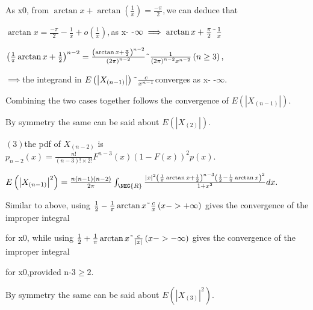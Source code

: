 \documentclass{article}
\begin{document}
As x\TEXTsymbol{<}0, from $\arctan x+\arctan \left( \frac{1}{x}\right) =%
\frac{-\pi }{2},$we can deduce that 

$\arctan x=\frac{-\pi }{2}-\frac{1}{x}+o\left( \frac{1}{x}\right) ,$as x-%
\TEXTsymbol{>}-$\infty \implies \arctan x+\frac{\pi }{2}\symbol{126}\frac{1}{%
x}$

$\left( \frac{1}{\pi }\arctan x+\frac{1}{2}\right) ^{n-2}=\frac{\left(
\arctan x+\frac{\pi }{2}\right) ^{n-2}}{\left( 2\pi \right) ^{n-2}}\symbol{%
126}\frac{1}{\left( 2\pi \right) ^{n-2}x^{n-2}}\left( n\geq 3\right) ,$

$\implies $the integrand in $E\left( \left\vert X_{\left( n-1\right)
}\right\vert \right) \symbol{126}\frac{c}{x^{n-1}}$converges as x-%
\TEXTsymbol{>}-$\infty .$

Combining the two cases together follows the convergence of $E\left(
\left\vert X_{\left( n-1\right) }\right\vert \right) .$

By symmetry the same can be said about $E\left( \left\vert X_{\left(
2\right) }\right\vert \right) .$

$\left( 3\right) $the pdf of $X_{\left( n-2\right) }$ is $p_{n-2}\left(
x\right) =\frac{n!}{\left( n-3\right) !\times 2!}F^{n-3}\left( x\right)
\left( 1-F\left( x\right) \right) ^{2}p\left( x\right) .$

$E\left( \left\vert X_{\left( n-1\right) }\right\vert ^{2}\right) =\frac{%
n\left( n-1\right) \left( n-2\right) }{2\pi }\int_{\NEG{R}}\frac{\left\vert
x\right\vert ^{2}\left( \frac{1}{\pi }\arctan x+\frac{1}{2}\right)
^{n-3}\left( \frac{1}{2}-\frac{1}{\pi }\arctan x\right) ^{2}}{1+x^{2}}dx.$

Similar to above, using $\frac{1}{2}-\frac{1}{\pi }\arctan x\symbol{126}%
\frac{c}{x}\left( x->+\infty \right) $ gives the convergence of the improper
integral 

for x\TEXTsymbol{>}0, while using $\frac{1}{2}+\frac{1}{\pi }\arctan x%
\symbol{126}\frac{c}{\left\vert x\right\vert }\left( x->-\infty \right) $
gives the convergence of the improper integral 

for x\TEXTsymbol{<}0,provided n-3$\geq 2.$

By symmetry the same can be said about $E\left( \left\vert X_{\left(
3\right) }\right\vert ^{2}\right) .$

\end{document}
